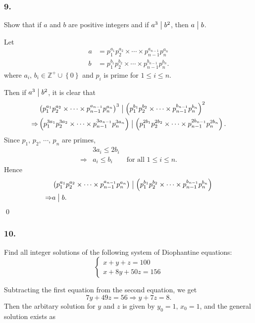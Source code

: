 \subsubsection{9.} Show that if $a$ and $b$ are positive integers and if
$a^3 \bigm| b^2$, then $a \bigm| b$.

Let
\begin{align*}
    a &= p_1^{a_1} p_2^{a_2} \times \cdots \times p_{n-1}^{a_{n-1}} p_n^{a_n} \\
    b &= p_1^{b_1} p_2^{b_2} \times \cdots \times p_{n-1}^{b_{n-1}} p_n^{b_n}.
\end{align*}
where $a_i,\,b_i \in \mathbb{Z}^+ \cup \left\{0\right\}$ and $p_i$ is prime for $1 \leq i \leq n$.

Then if $a^3 \bigm| b^2$, it is clear that
\begin{align*}
    & \left(p_1^{a_1} p_2^{a_2} \times \cdots \times p_{n-1}^{a_{n-1}} p_n^{a_n}\right)^3
    \bigm| \left(p_1^{b_1} p_2^{b_2} \times \cdots \times p_{n-1}^{b_{n-1}} p_n^{b_n}\right)^2 \\
    \Rightarrow & \left(p_1^{3a_1} p_2^{3a_2} \times \cdots \times p_{n-1}^{3a_{n-1}} p_n^{3a_n}\right)
    \bigm| \left(p_1^{2b_1} p_2^{2b_2} \times \cdots \times p_{n-1}^{2b_{n-1}} p_n^{2b_n}\right).
\end{align*}
Since $p_1,\, p_2,\, \cdots,\, p_n$ are primes,
\begin{align*}
    & 3a_i \leq 2b_i \\
    \Rightarrow & a_i \leq b_i \qquad \mbox{for all } 1 \leq i \leq n.
\end{align*}
Hence
\begin{align*}
    & \left(p_1^{a_1} p_2^{a_2} \times \cdots \times p_{n-1}^{a_{n-1}} p_n^{a_n}\right)
    \bigm| \left(p_1^{b_1} p_2^{b_2} \times \cdots \times p_{n-1}^{b_{n-1}} p_n^{b_n}\right) \\
    \Rightarrow & a \bigm| b.
\end{align*}
\qed

\subsubsection{10.} Find all integer solutions of the following system of
Diophantine equations:
\[
\begin{cases}
    x+y+z=100\\
    x+8y+50z=156
\end{cases}
\]

Subtracting the first equation from the second equation, we get
\[
    7y + 49z = 56 \Rightarrow y + 7z = 8.
\]
Then the arbitary solution for $y$ and $z$ is given by $y_0=1,\,x_0=1$,
and the general solution exists as

